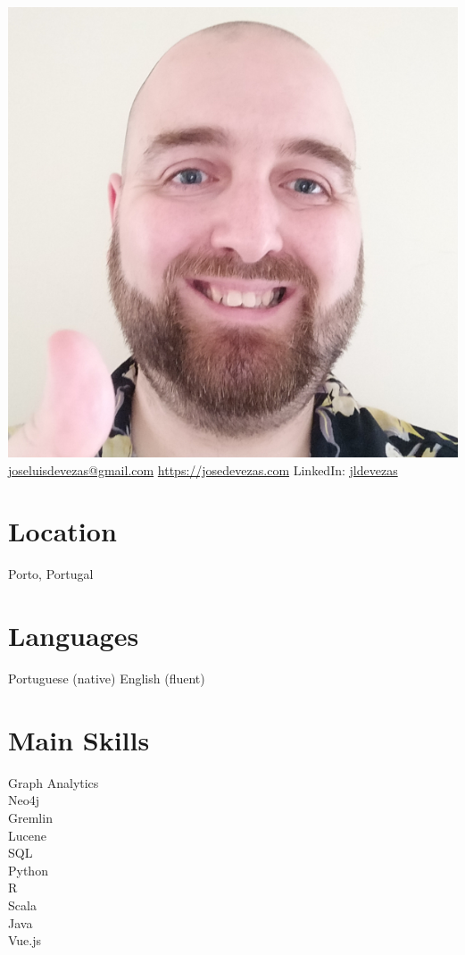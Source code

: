 \documentclass{friggeri-cv}
\begin{document}


\begin{aside} %
\includegraphics[width=\textwidth]{photo.jpg}
%
{\footnotesize \href{mailto:joseluisdevezas@gmail.com}{joseluisdevezas@gmail.com}
\href{https://josedevezas.com}{https://josedevezas.com}
LinkedIn: \href{https://www.linkedin.com/in/jldevezas/?locale=en_US}{jldevezas}}
%
\section{Location}
Porto, Portugal
%
\section{Languages}
Portuguese (native)
English (fluent)
%
\section{Main Skills}
{\small Graph Analytics\\Neo4j\\Gremlin\\Lucene\\SQL\\Python\\R\\Scala\\Java\\Vue.js}
%

\end{aside}
\end{document}
